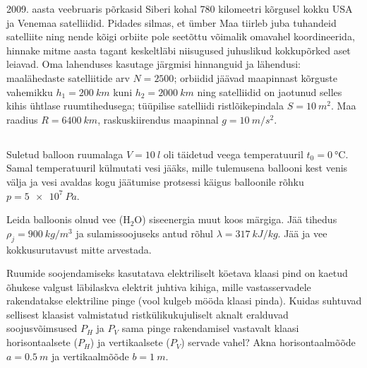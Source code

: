 \documentclass[10pt, twoside]{article}
\begin{document}
{
2009. aasta veebruaris põrkasid Siberi kohal 780 kilomeetri kõrgusel kokku USA ja Venemaa satelliidid. Pidades silmas, et ümber Maa tiirleb juba tuhandeid satelliite ning nende kõigi orbiite pole seetõttu võimalik omavahel koordineerida, hinnake mitme aasta tagant keskeltläbi niisugused juhuslikud kokkupõrked aset leiavad. Oma lahenduses kasutage järgmisi hinnanguid ja lähendusi: maalähedaste satelliitide arv $N=\num{2500}$; orbiidid jäävad maapinnast kõrguste vahemikku $h_1=\SI{200}{km}$ kuni $h_2=\SI{2000}{km}$ ning satelliidid on jaotunud selles kihis ühtlase ruumtihedusega; tüüpilise satelliidi ristlõikepindala $S=\SI{10}{m^2}$. Maa raadius $R=\SI{6400}{km}$, raskuskiirendus maapinnal $g=\SI{10}{m/s^2}$.
\probend
\bigskip
\newpage\subsection{\protect{}}


Suletud balloon ruumalaga $V = \SI{10}{l}$ oli täidetud veega temperatuuril $t_0 = \SI{0}{\degreeCelsius}$. Samal temperatuuril külmutati vesi jääks, mille tulemusena ballooni kest venis välja ja vesi avaldas kogu jäätumise protsessi käigus balloonile rõhku $p = \SI{5e7}{Pa}$.

Leida balloonis olnud vee ($\mathrm{H_2O}$) siseenergia muut koos märgiga. Jää tihedus $\rho_j = \SI{900}{kg/m^3}$ ja sulamissoojuseks antud rõhul $\lambda = \SI{317}{kJ/kg}$. Jää ja vee kokkusurutavust mitte arvestada.
\probend
\bigskip


Ruumide soojendamiseks kasutatava elektriliselt köetava klaasi pind on kaetud õhukese valgust läbilaskva elektrit juhtiva kihiga, mille vastasservadele rakendatakse elektriline pinge (vool kulgeb mööda klaasi pinda). Kuidas suhtuvad sellisest klaasist valmistatud ristkülikukujuliselt aknalt eralduvad soojusvõimsused $P_H$ ja $P_V$ sama pinge rakendamisel vastavalt klaasi horisontaalsete ($P_H$) ja vertikaalsete ($P_V$) servade vahel? Akna horisontaalmõõde $a = \SI{0,5}{m}$ ja vertikaalmõõde $b = \SI{1}{m}$.
\probend
\bigskip


}
\end{document}
